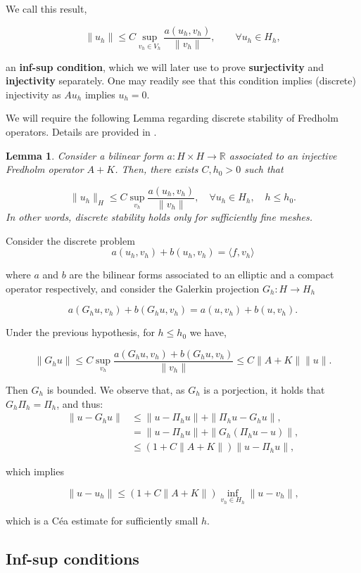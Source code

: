 \documentclass{article}
\newcommand{\R}{\mathbb{R}}
\newtheorem{lemma}{Lemma}
\begin{document}
We call this result,

\[\|u_h\| \leq C\sup_{v_h\in V_h}\frac{a(u_h,v_h)}{\|v_h\|},\qquad \forall u_h\in H_h,\]

an \textbf{inf-sup condition}, which we will later use to prove \textbf{surjectivity} and \textbf{injectivity} separately. One may readily see that this condition implies (discrete) injectivity as $Au_h$ implies $u_h = 0$.

We will require the following Lemma regarding discrete stability of Fredholm operators. Details are provided in \cite{sayas2019variational}.
\begin{lemma}
Consider a bilinear form $a:H\times H\to \R$ associated to an injective Fredholm operator $A+K$. Then, there exists $C, h_0>0$ such that

\[\|u_h\|_H\leq C\sup_{v_h}\frac{a(u_h,v_h)}{\|v_h\|},\quad \forall u_h\in H_h, \quad h\leq h_0.\]
In other words, discrete stability holds only for sufficiently fine meshes. 
\end{lemma}

Consider the discrete problem
\[a(u_h,v_h) + b(u_h,v_h) = \langle f, v_h\rangle\]

where $a$ and $b$ are the bilinear forms associated to an elliptic and a compact operator respectively, and consider the Galerkin projection $G_h: H\to H_h$

\[a(G_hu, v_h) + b(G_hu, v_h) = a(u, v_h) + b(u,v_h).\]

Under the previous hypothesis, for $h\leq h_0$ we have, 

\[\|G_hu\|\leq C\sup_{v_h}\frac{a(G_hu, v_h) + b(G_hu, v_h)}{\|v_h\|}\leq C\|A+K\|\|u\|.\]

Then $G_h$ is bounded. We observe that, as $G_h$ is a porjection, it holds that $G_h\Pi_h = \Pi_h$, and thus:
\begin{align*}
    \|u - G_hu\|&\leq \|u-\Pi_hu\| + \|\Pi_hu - G_hu\|,\\
    &= \|u-\Pi_hu\| + \|G_h(\Pi_hu - u)\|,\\
    &\leq (1+C\|A+K\|)\|u - \Pi_h u\|,
\end{align*}

which implies

\[\|u-u_h\|\leq (1+C\|A+K\|)\inf_{v_h\in H_h}\|u-v_h\|,\] 

which is a Céa estimate for sufficiently small $h$.
\subsection{Inf-sup conditions}
\end{document}
